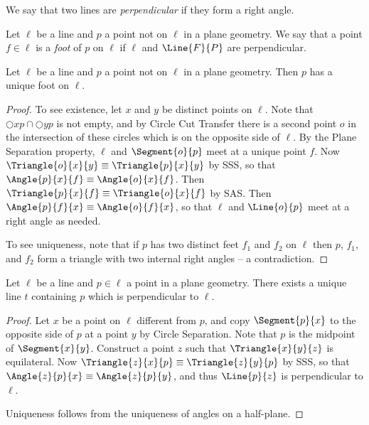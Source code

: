 \documentclass{article}
\begin{document}

We say that two lines are \emph{perpendicular} if they form a right angle.

\begin{dfn}[Foot]
Let $\ell$ be a line and $p$ a point not on $\ell$ in a plane geometry. We say that a point $f \in \ell$ is a \emph{foot} of $p$ on $\ell$ if $\ell$ and $\Line{F}{P}$ are perpendicular.
\end{dfn}

\begin{construct}
Let $\ell$ be a line and $p$ a point not on $\ell$ in a plane geometry. Then $p$ has a unique foot on $\ell$.
\end{construct}

\begin{proof}
To see existence, let $x$ and $y$ be distinct points on $\ell$. Note that $\Circle{x}{p} \cap \Circle{y}{p}$ is not empty, and by Circle Cut Transfer there is a second point $o$ in the intersection of these circles which is on the opposite side of $\ell$. By the Plane Separation property, $\ell$ and $\Segment{o}{p}$ meet at a unique point $f$. Now $\Triangle{o}{x}{y} \equiv \Triangle{p}{x}{y}$ by SSS, so that $\Angle{p}{x}{f} \equiv \Angle{o}{x}{f}$. Then $\Triangle{p}{x}{f} \equiv \Triangle{o}{x}{f}$ by SAS. Then $\Angle{p}{f}{x} \equiv \Angle{o}{f}{x}$, so that $\ell$ and $\Line{o}{p}$ meet at a right angle as needed.

To see uniqueness, note that if $p$ has two distinct feet $f_1$ and $f_2$ on $\ell$ then $p$, $f_1$, and $f_2$ form a triangle with two internal right angles -- a contradiction.
\end{proof}

\begin{construct}
Let $\ell$ be a line and $p \in \ell$ a point in a plane geometry. There exists a unique line $t$ containing $p$ which is perpendicular to $\ell$.
\end{construct}

\begin{proof}
Let $x$ be a point on $\ell$ different from $p$, and copy $\Segment{p}{x}$ to the opposite side of $p$ at a point $y$ by Circle Separation. Note that $p$ is the midpoint of $\Segment{x}{y}$. Construct a point $z$ such that $\Triangle{x}{y}{z}$ is equilateral. Now $\Triangle{z}{x}{p} \equiv \Triangle{z}{y}{p}$ by SSS, so that $\Angle{z}{p}{x} \equiv \Angle{z}{p}{y}$, and thus $\Line{p}{z}$ is perpendicular to $\ell$.

Uniqueness follows from the uniqueness of angles on a half-plane.
\end{proof}
\end{document}
